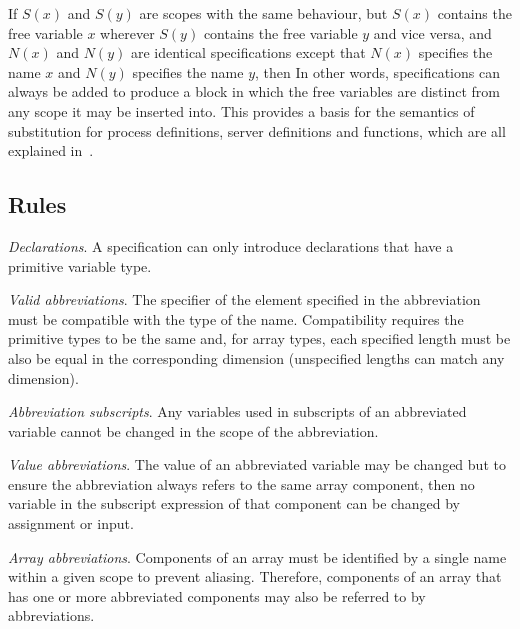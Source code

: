 \documentclass[11pt,a4paper,parskip=half-]{scrartcl}
\begin{document}
If $S(x)$ and $S(y)$ are scopes with the same behaviour, but $S(x)$ contains
the free variable $x$ wherever $S(y)$ contains the free variable $y$ and
vice versa, and $N(x)$ and $N(y)$ are identical specifications except that
$N(x)$ specifies the name $x$ and $N(y)$ specifies the name $y$, then
%
In other words, specifications can always be added to produce a block in which
the free variables are distinct from any scope it may be inserted into. 
%
This provides a basis for the semantics of substitution for process
definitions, server definitions and functions, which are all explained
in~.


\subsection{Rules}
\label{sec:abbreviation-rules}

\ben

\item \emph{Declarations}. A specification can only introduce declarations that
  have a primitive variable type. 

\item \emph{Valid abbreviations}. The specifier of the element specified in the
  abbreviation must be compatible with the type of the name.  Compatibility
  requires the primitive types to be the same and, for array types, each
  specified length must be also be equal in the corresponding dimension
  (unspecified lengths can match any dimension).

\item \emph{Abbreviation subscripts}. Any variables used in subscripts of an
  abbreviated variable cannot be changed in the scope of the abbreviation.

\item \emph{Value abbreviations}.  The value of an abbreviated variable may be
  changed but to ensure the abbreviation always refers to the same array
  component, then no variable in the subscript expression of that component can
  be changed by assignment or input.

\item \emph{Array abbreviations}. Components of an array must be identified by
  a single name within a given scope to prevent aliasing. Therefore, components
  of an array that has one or more abbreviated components may also be referred
  to by abbreviations.

\een
\end{document}
